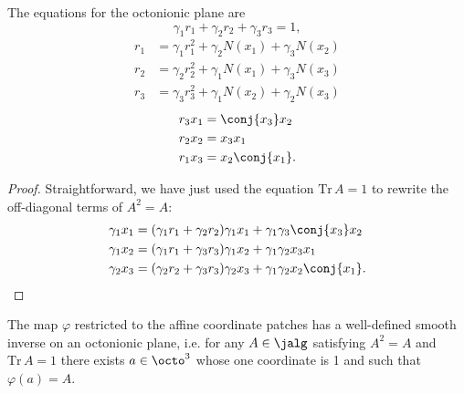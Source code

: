 \begin{lemma}
 The equations for the octonionic plane are 
\begin{equation}\label{eq:trace}
\gamma_1 r_1 + \gamma_2 r_2 + \gamma_3 r_3 = 1,
\end{equation}
\begin{align}
 r_1 & = \gamma_1 r_1^2 + \gamma_2 N(x_1) + \gamma_3 N(x_2) \label{eq:diag1}\\
 r_2 & = \gamma_2 r_2^2 + \gamma_1 N(x_1) + \gamma_3 N(x_3) \label{eq:diag2} \\
 r_3 & = \gamma_3 r_3^2 + \gamma_1 N(x_2) + \gamma_2 N(x_3) \label{eq:diag3}
\end{align}
\begin{align}
 r_3 x_1 &= \conj{x_3}x_2 \label{eq:antidiag1} \\
 r_2 x_2 &= x_3 x_1 \label{eq:antidiag2} \\
 r_1 x_3 &= x_2\conj{x_1}.  \label{eq:antidiag3}
\end{align}
\end{lemma}
\begin{proof}
Straightforward, we have just used the equation $\mathrm{Tr}\, A = 1$ to rewrite the off-diagonal terms of $A^2=A$:
\begin{align*}
\gamma_1 x_1 &= (\gamma_1 r_1 + \gamma_2 r_2)\gamma_1 x_1  + \gamma_1\gamma_3 \conj{x_3}x_2 \\
\gamma_1 x_2 &= (\gamma_1 r_1 + \gamma_3 r_3)\gamma_1 x_2  + \gamma_1\gamma_2 x_3 x_1 \\
\gamma_2 x_3 &= (\gamma_2 r_2 + \gamma_3 r_3)\gamma_2 x_3  + \gamma_1\gamma_2 x_2\conj{x_1}.
\end{align*}


\end{proof}
\begin{lemma}
The map $\varphi$ restricted to the affine coordinate patches has a well-defined smooth inverse on an octonionic plane, i.e. for any $A \in \jalg$ satisfying $A^2 = A$ and $\mathrm{Tr}\, A = 1$ there exists $a\in \octo^3$ whose one coordinate is 1 and such that $\varphi(a) = A$.
\end{lemma}
